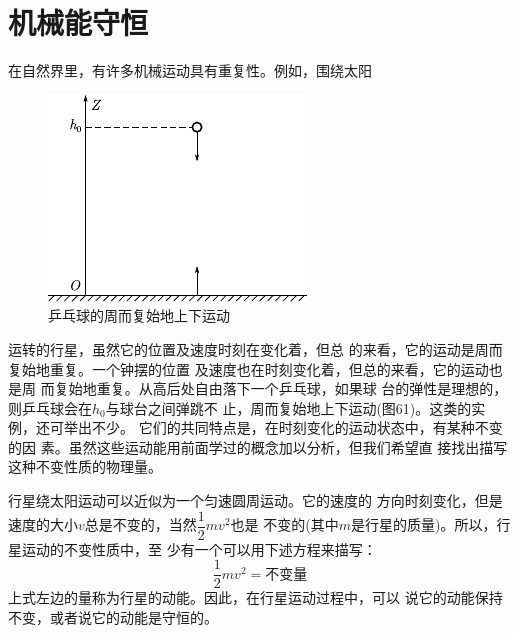 \section{机械能守恒}\label{sec:06.01}

在自然界里，有许多机械运动具有重复性。例如，围绕太阳
\begin{figure}
 \centering
 \includegraphics{figure/fig06.01}\vspace{1em}
 \caption{乒乓球的周而复始地上下运动}
 \label{fig:06.01}
\end{figure}
运转的行星，虽然它的位置及速度时刻在变化着，但总
的来看，它的运动是周而复始地重复。一个钟摆的位置
及速度也在时刻变化着，但总的来看，它的运动也是周
而复始地重复。从高后处自由落下一个乒乓球，如果球
台的弹性是理想的，则乒乓球会在$ h _ { 0 } $与球台之间弹跳不
止，周而复始地上下运动(图61)。这类的实例，还可举出不少。
它们的共同特点是，在时刻变化的运动状态中，有某种不变的因
素。虽然这些运动能用前面学过的概念加以分析，但我们希望直
接找出描写这种不变性质的物理量。

行星绕太阳运动可以近似为一个匀速圆周运动。它的速度的
方向时刻变化，但是速度的大小$ v $总是不变的，当然$ \dfrac { 1 } { 2 } m v ^ { 2 } $也是
\clearpage\noindent
不变的(其中$ m $是行星的质量)。所以，行星运动的不变性质中，至
少有一个可以用下述方程来描写：
\begin{equation}\label{eqn:06.01.01}
 \frac { 1 } { 2 } m v ^ { 2 } = \text{不变量}
\end{equation}
上式左边的量称为行星的动能。因此，在行星运动过程中，可以
说它的动能保持不变，或者说它的动能是守恒的。

